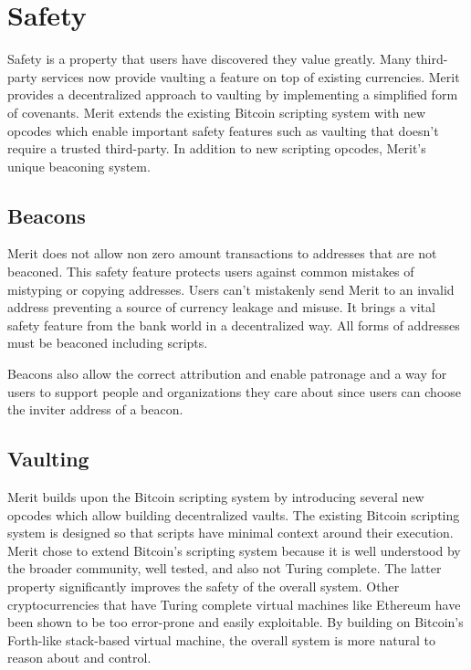 \documentclass{article}
\begin{document}
\section{Safety}

Safety is a property that users have discovered they value greatly. Many third-party
services now provide vaulting a feature on top of existing currencies. Merit
provides a decentralized approach to vaulting by implementing a simplified form
of covenants. Merit extends the existing Bitcoin scripting system with new
opcodes which enable important safety features such as vaulting that doesn't
require a trusted third-party. In addition to new scripting opcodes, Merit's
unique beaconing system.

\subsection{Beacons}

Merit does not allow non zero amount transactions to addresses that are not beaconed.
This safety feature protects users against common mistakes of mistyping or copying
addresses. Users can't mistakenly send Merit to an invalid address preventing
a source of currency leakage and misuse. It brings a vital safety feature
from the bank world in a decentralized way. All forms of addresses must be
beaconed including scripts.

Beacons also allow the correct attribution and enable patronage and a way for users
to support people and organizations they care about since users can choose the
inviter address of a beacon. 

\subsection{Vaulting}

Merit builds upon the Bitcoin scripting system by introducing several new opcodes
which allow building decentralized vaults. The existing Bitcoin scripting system
is designed so that scripts have minimal context around their execution. Merit
chose to extend Bitcoin's scripting system because it is well understood by the
broader community, well tested, and also not Turing complete.  The latter property
significantly improves the safety of the overall system.  Other cryptocurrencies
that have Turing complete virtual machines like Ethereum have been shown to be too
error-prone and easily exploitable. By building on Bitcoin's Forth-like stack-based
virtual machine, the overall system is more natural to reason about and control.
\end{document}
